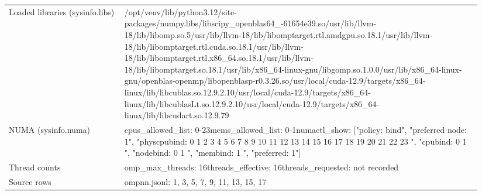 \begin{longtable}{>{\raggedright\arraybackslash}p{0.23\linewidth}>{\raggedright\arraybackslash}p{0.71\linewidth}}
Loaded libraries (sysinfo.libs) & /\allowbreak{}opt/\allowbreak{}venv/\allowbreak{}lib/\allowbreak{}python3.12/\allowbreak{}site-packages/\allowbreak{}numpy.libs/\allowbreak{}libscipy\_\allowbreak{}openblas64\_\allowbreak{}-61654e39.so\newline /\allowbreak{}usr/\allowbreak{}lib/\allowbreak{}llvm-18/\allowbreak{}lib/\allowbreak{}libomp.so.5\newline /\allowbreak{}usr/\allowbreak{}lib/\allowbreak{}llvm-18/\allowbreak{}lib/\allowbreak{}libomptarget.rtl.amdgpu.so.18.1\newline /\allowbreak{}usr/\allowbreak{}lib/\allowbreak{}llvm-18/\allowbreak{}lib/\allowbreak{}libomptarget.rtl.cuda.so.18.1\newline /\allowbreak{}usr/\allowbreak{}lib/\allowbreak{}llvm-18/\allowbreak{}lib/\allowbreak{}libomptarget.rtl.x86\_\allowbreak{}64.so.18.1\newline /\allowbreak{}usr/\allowbreak{}lib/\allowbreak{}llvm-18/\allowbreak{}lib/\allowbreak{}libomptarget.so.18.1\newline /\allowbreak{}usr/\allowbreak{}lib/\allowbreak{}x86\_\allowbreak{}64-linux-gnu/\allowbreak{}libgomp.so.1.0.0\newline /\allowbreak{}usr/\allowbreak{}lib/\allowbreak{}x86\_\allowbreak{}64-linux-gnu/\allowbreak{}openblas-openmp/\allowbreak{}libopenblasp-r0.3.26.so\newline /\allowbreak{}usr/\allowbreak{}local/\allowbreak{}cuda-12.9/\allowbreak{}targets/\allowbreak{}x86\_\allowbreak{}64-linux/\allowbreak{}lib/\allowbreak{}libcublas.so.12.9.2.10\newline /\allowbreak{}usr/\allowbreak{}local/\allowbreak{}cuda-12.9/\allowbreak{}targets/\allowbreak{}x86\_\allowbreak{}64-linux/\allowbreak{}lib/\allowbreak{}libcublasLt.so.12.9.2.10\newline /\allowbreak{}usr/\allowbreak{}local/\allowbreak{}cuda-12.9/\allowbreak{}targets/\allowbreak{}x86\_\allowbreak{}64-linux/\allowbreak{}lib/\allowbreak{}libcudart.so.12.9.79 \\
NUMA (sysinfo.numa) & cpus\_\allowbreak{}allowed\_\allowbreak{}list: 0-23\newline mems\_\allowbreak{}allowed\_\allowbreak{}list: 0-1\newline numactl\_\allowbreak{}show: ["policy: bind", "preferred node: 1", "physcpubind: 0 1 2 3 4 5 6 7 8 9 10 11 12 13 14 15 16 17 18 19 20 21 22 23 ", "cpubind: 0 1 ", "nodebind: 0 1 ", "membind: 1 ", "preferred: 1"] \\
Thread counts & omp\_\allowbreak{}max\_\allowbreak{}threads: 16\newline threads\_\allowbreak{}effective: 16\newline threads\_\allowbreak{}requested: not recorded \\
Source rows & ompnn.jsonl: 1, 3, 5, 7, 9, 11, 13, 15, 17 \\
\end{longtable}

